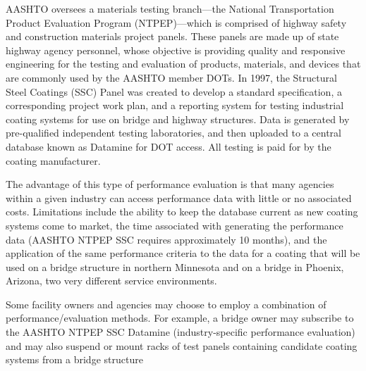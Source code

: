 AASHTO oversees a materials testing branch—the National Transportation Product Evaluation Program
(NTPEP)—which is comprised of highway safety and construction materials project panels. These panels are made
up of state highway agency personnel, whose objective is providing quality and responsive engineering for the testing
and evaluation of products, materials, and devices that are commonly used by the AASHTO member DOTs. In 1997,
the Structural Steel Coatings (SSC) Panel was created to develop a standard specification, a corresponding project
work plan, and a reporting system for testing industrial coating systems for use on bridge and highway structures. Data is generated by pre-qualified independent testing laboratories, and then uploaded to a central database known as
Datamine for DOT access. All testing is paid for by the coating manufacturer.

The advantage of this type of performance evaluation is that many agencies within a given industry can access
performance data with little or no associated costs. Limitations include the ability to keep the database current as new
coating systems come to market, the time associated with generating the performance data (AASHTO NTPEP SSC
requires approximately 10 months), and the application of the same performance criteria to the data for a coating that
will be used on a bridge structure in northern Minnesota and on a bridge in Phoenix, Arizona, two very different
service environments.

Some facility owners and agencies may choose to employ a combination of performance/evaluation methods. For
example, a bridge owner may subscribe to the AASHTO NTPEP SSC Datamine (industry-specific performance
evaluation) and may also suspend or mount racks of test panels containing candidate coating systems from a bridge
structure